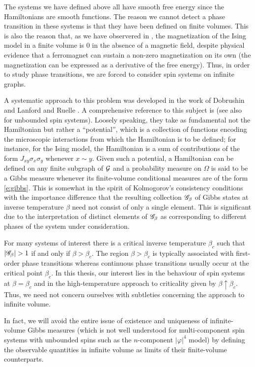 The systems we have defined above all
have smooth free energy since the Hamiltonians are smooth functions. The reason we cannot
detect a phase transition in these systems is that they have been defined on finite volumes.
This is also the reason that, as we have observered in \REF, the magnetization of the Ising
model in a finite volume is $0$ in the absence of a magnetic field, despite physical evidence
that a ferromagnet can sustain a non-zero magnetization on its own (the magnetization can
be expressed as a derivative of the free energy).
Thus, in order to study phase transitions, we are forced to consider
spin systems on infinite graphs.

A systematic approach to this problem was developed in the work of Dobrushin \cite{Dobrushin68}
and Lanford and Ruelle \cite{LR69}. A comprehensive reference to this subject is \cite{Georgii11}
(see also \cite{LP76} for unbounded spin systems).
Loosely speaking, they take as fundamental not the Hamiltonian
but rather a ``potential'', which is a collection of functions encoding the microscopic interactions
from which the Hamiltonian is to be defined; for instance, for the Ising model,
the Hamiltonian is a sum of contributions of the form $J_{xy} \sigma_x \sigma_y$ whenever
$x \sim y$. Given such a potential, a Hamiltonian can be defined on any
finite subgraph of $\mathcal{G}$ and a probability measure on $\Omega$ is said to be a Gibbs
measure whenever its finite-volume conditional measures are of the form \eqref{e:gibbs}.
This is somewhat in the spirit of Kolmogorov's consistency conditions with the importance
difference that the resulting collection $\mathscr{G}_\beta$ of Gibbs states at inverse temperature
$\beta$ need not consist of only a single element. This is significant due to the interpretation
of distinct elements of $\mathscr{G}_\beta$ as corresponding to different phases of the system under
consideration.

For many systems of interest there is a critical inverse temperature $\beta_c$ such that
$|\mathscr{G}_\beta| > 1$ if and only if $\beta > \beta_c$. The region $\beta > \beta_c$ is typically
associated with first-order phase transitions whereas continuous phase transitions usually occur
at the critical point $\beta_c$.
In this thesis, our interest lies in the behaviour of spin systems at $\beta = \beta_c$ and in the
high-temperature approach to criticality given by $\beta \uparrow \beta_c$.
Thus, we need not concern ourselves with subtleties concerning the approach to infinite volume.

In fact, we will avoid the entire issue of existence and uniqueness of infinite-volume Gibbs
measures (which is not well understood for multi-component spin systems with unbounded spins
such as the $n$-component $|\varphi|^4$ model) by defining the observable quantities in infinite
volume as limits of their finite-volume counterparts.

